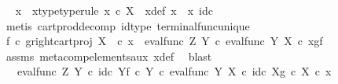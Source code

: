 \begin{isabellebody}
\ \isamarkupfalse%
\ x\ \ x{\isacharunderscore}{\kern0pt}type{\isacharbrackleft}{\kern0pt}type{\isacharunderscore}{\kern0pt}rule{\isacharbrackright}{\kern0pt}{\isacharcolon}{\kern0pt}\ {\isachardoublequoteopen}x\ {\isasymin}\isactrlsub c\ X{\isachardoublequoteclose}\ \ x{\isacharunderscore}{\kern0pt}def{\isacharcolon}{\kern0pt}\ {\isachardoublequoteopen}x{}\ {\isacharequal}{\kern0pt}\ {\isasymlangle}x{\isacharcomma}{\kern0pt}\ id\isactrlsub c\ {\isasymone}{\isasymrangle}{\isachardoublequoteclose}\isanewline
\ \ \ \ \ \ \isamarkupfalse%
\ {\isacharparenleft}{\kern0pt}metis\ cart{\isacharunderscore}{\kern0pt}prod{\isacharunderscore}{\kern0pt}decomp\ id{\isacharunderscore}{\kern0pt}type\ terminal{\isacharunderscore}{\kern0pt}func{\isacharunderscore}{\kern0pt}unique{\isacharparenright}{\kern0pt}\isanewline
\ \ \ \ \isamarkupfalse%
\ \isamarkupfalse%
\ {\isachardoublequoteopen}{\isacharparenleft}{\kern0pt}f\isactrlsup {\isasymflat}\ {\isasymcirc}\isactrlsub c\ {\isasymlangle}g\isactrlsup {\isasymflat}{\isacharcomma}{\kern0pt}right{\isacharunderscore}{\kern0pt}cart{\isacharunderscore}{\kern0pt}proj\ X\ {\isasymone}{\isasymrangle}{\isacharparenright}{\kern0pt}\ {\isasymcirc}\isactrlsub c\ x{}\ {\isacharequal}{\kern0pt}\ eval{\isacharunderscore}{\kern0pt}func\ Z\ Y\ {\isasymcirc}\isactrlsub c\ {\isasymlangle}eval{\isacharunderscore}{\kern0pt}func\ Y\ X\ {\isasymcirc}\isactrlsub c\ {\isasymlangle}x{\isacharcomma}{\kern0pt}g{\isasymrangle}{\isacharcomma}{\kern0pt}f{\isasymrangle}{\isachardoublequoteclose}\isanewline
\ \ \ \ \ \ \isamarkupfalse%
\ assms\ meta{\isacharunderscore}{\kern0pt}comp{}{\isacharunderscore}{\kern0pt}elements{\isacharunderscore}{\kern0pt}aux\ x{\isacharunderscore}{\kern0pt}def\ \isamarkupfalse%
\ blast\isanewline
\ \ \ \ \isamarkupfalse%
\ \isamarkupfalse%
\ {\isachardoublequoteopen}{\isachardot}{\kern0pt}{\isachardot}{\kern0pt}{\isachardot}{\kern0pt}\ {\isacharequal}{\kern0pt}\ eval{\isacharunderscore}{\kern0pt}func\ Z\ Y\ {\isasymcirc}\isactrlsub c\ {\isasymlangle}id\isactrlsub c\ Y{\isacharcomma}{\kern0pt}f\ {\isasymcirc}\isactrlsub c\ {\isasymbeta}\isactrlbsub Y\isactrlesub {\isasymrangle}\ {\isasymcirc}\isactrlsub c\ eval{\isacharunderscore}{\kern0pt}func\ Y\ X\ {\isasymcirc}\isactrlsub c\ {\isasymlangle}id\isactrlsub c\ X{\isacharcomma}{\kern0pt}g\ {\isasymcirc}\isactrlsub c\ {\isasymbeta}\isactrlbsub X\isactrlesub {\isasymrangle}\ {\isasymcirc}\isactrlsub c\ x{\isachardoublequoteclose}\isanewline

\end{isabellebody}
